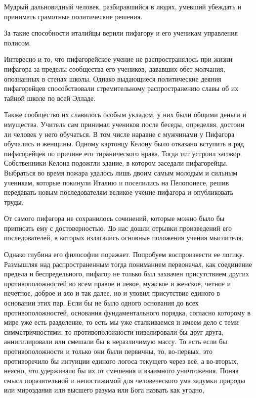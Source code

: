 Мудрый дальновидный человек,
разбиравшийся в людях, умевший убеждать и принимать грамотные политические
решения. 

За такие способности италийцы верили пифагору и его ученикам управления
полисом. 

Интересно и то, что пифагорейское учение не распространялось при жизни
пифагора за пределы сообщества его учеников, дававших обет молчания, опознанных
в стенах школы. Однако выдающиеся политические деяния пифагорейцев
способствовали стремительному распространению славы об их тайной школе по всей
Элладе. 

Также сообщество их славилось особым укладом, у них были общими деньги и
имущества. Учитель сам принимал учеников после беседы, определяя, достоин ли
человек у него обучаться. В том числе наравне с мужчинами у Пифагора обучались и
женщины. Одному картонцу Келону было отказано вступить в ряд пифагорейцев по
причине его тиранического нрава. Тогда тот устроил заговор. Собственники Келона
подожгли здание, в котором заседали пифагорейцы. Выбраться во время пожара
удалось лишь двоим самым молодым и сильным ученикам, которые покинули Италию и
поселились на Пелопонесе, решив передавать новым последователям великое учение
пифагора и опубликовать труды. 

От самого пифагора не сохранилось сочинений,
которые можно было бы приписать ему с достоверностью. До нас дошли отрывки
произведений его последователей, в которых излагались основные положения учения
мыслителя. 

Однако глубина его философии поражает. Попробуем воспроизвести ее
логику. Размышляя над распространенным тогда пониманием первоначал, как
соединение предела и беспредельного, пифагор не только был захвачен присутствием
других противоположностей во всем правое и левое, мужское и женское, четное и
нечетное, доброе и зло и так далее, но и уловил присутствие единого в основании
этих пар. Если бы не было одного основания до всех противоположностей, основания
фундаментального порядка, согласно которому в мире уже есть разделение, то есть
мы уже сталкиваемся и имеем дело с теми симметричностями, то противоположности
нивелировали бы друг друга, аннигилировали или смешали бы в неразличимую массу.
То есть если бы противоположности и только они были первичны, то, во-первых, это
противоречило бы интуиции единого логоса текущего через всё, а во-вторых,
неясно, что удерживало бы их от смешения и взаимного уничтожения. Поняв смысл
поразительной и непостижимой для человеческого ума задумки природы или
мироздания или высшего разума или Бога назвать как угодно, 

